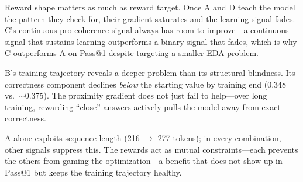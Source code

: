 Reward shape matters as much as reward target.
Once A and D teach the model the pattern they check for, their gradient saturates and the learning signal fades.
C's continuous pro-coherence signal always has room to improve---a continuous signal that sustains learning outperforms a binary signal that fades, which is why C outperforms A on Pass@1 despite targeting a smaller EDA problem.

B's training trajectory reveals a deeper problem than its structural blindness.
Its correctness component declines \emph{below} the starting value by training end (0.348 vs.\ $\sim$0.375).
The proximity gradient does not just fail to help---over long training, rewarding ``close'' answers actively pulls the model away from exact correctness.

A alone exploits sequence length (216 $\to$ 277 tokens); in every combination, other signals suppress this.
The rewards act as mutual constraints---each prevents the others from gaming the optimization---a benefit that does not show up in Pass@1 but keeps the training trajectory healthy.

\nestunindent
\nestunindent
